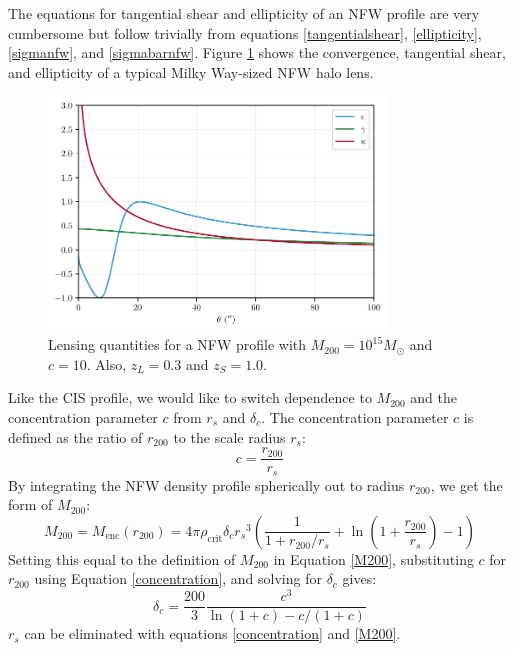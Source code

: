 \documentclass[10pt]{article}
\begin{document}
The equations for tangential shear and ellipticity of an NFW profile are very cumbersome but follow trivially from equations \ref{tangentialshear}, \ref{ellipticity}, \ref{sigmanfw}, and \ref{sigmabarnfw}. Figure \ref{nfwproperties} shows the convergence, tangential shear, and ellipticity of a typical Milky Way-sized NFW halo lens.

\begin{figure}
    \centering
    \includegraphics[width=0.8\textwidth]{nfwproperties.pdf}
    \caption{Lensing quantities for a NFW profile with $M_{200} = 10^{15} M_\odot$ and $c = 10$. Also,  $z_L = 0.3$ and $z_S = 1.0$.}
    \label{nfwproperties}
\end{figure}

Like the CIS profile, we would like to switch dependence to $M_{200}$ and the concentration parameter $c$ from $r_s$ and $\delta_c$. The concentration parameter $c$ is defined as the ratio of $r_{200}$ to the scale radius $r_s$:
\begin{equation} \label{concentration}
c = \frac{r_{200}}{r_s}
\end{equation}
By integrating the NFW density profile spherically out to radius $r_{200}$, we get the form of $M_{200}$:
\begin{equation} \label{nfwM200}
M_{200} = M_\mathrm{enc}(r_{200}) = 4 \pi \rho_\mathrm{crit} \delta_c {r_s}^3 \left( \frac{1}{1 + r_{200}/r_s} + \ln{\left(1 + \frac{r_{200}}{r_s} \right)} - 1 \right)
\end{equation}
Setting this equal to the definition of $M_{200}$ in Equation \ref{M200}, substituting $c$ for $r_{200}$ using Equation \ref{concentration}, and solving for $\delta_c$ gives:
\begin{equation}
\delta_c = \frac{200}{3} \frac{c^3}{\ln(1 + c) - c/(1 + c)}
\end{equation}
$r_s$ can be eliminated with equations \ref{concentration} and \ref{M200}.
\end{document}
